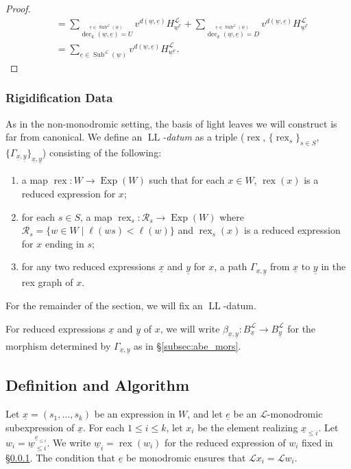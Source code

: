 \documentclass{amsart}
\newcommand{\scrL}{\mathcal{L}}
\DeclareMathOperator{\rex}{rex}
\DeclareMathOperator{\LL}{LL}
\DeclareMathOperator{\dec}{dec}
\DeclareMathOperator{\Exp}{Exp}
\DeclareMathOperator{\Subexp}{Sub}
\newcommand{\ue}{\underline{e}}
\newcommand{\uw}{\underline{w}}
\newcommand{\ux}{\underline{x}}
\newcommand{\uy}{\underline{y}}
\theoremstyle{definition}
\numberwithin{equation}{subsection}
\begin{document}
\begin{proof}
\begin{align*}
        &= \sum_{\stackrel{\ue \in \Subexp^{\scrL} (\uw)}{\dec_k (\uw, \ue) = U}} v^{d(\uw,\ue)} H_{\uw^{\ue}}^{\scrL}  + \sum_{\stackrel{\ue \in \Subexp^{\scrL} (\uw)}{\dec_k (\uw, \ue) = D}} v^{d(\uw,\ue)} H_{\uw^{\ue}}^{\scrL} \\
        &=  \sum_{\ue \in \Subexp^{\scrL} (\uw)} v^{d(\uw,\ue)} H_{\uw^{\ue}}^{\scrL}.
    \end{align*}
\end{proof}


\subsubsection{Rigidification Data}\label{subsec:rigidification_data}

As in the non-monodromic setting, the basis of light leaves we will construct is far from canonical.
We define an \emph{$\LL$-datum} as a triple ($\rex$, $\{\rex_s\}_{s \in S}$, $\{\Gamma_{\ux, \uy}\}_{\ux, \uy}$) consisting of the following:
\begin{enumerate}\label{ll_disiderata}
    \item a map $\rex : W \to \Exp (W)$ such that for each $x \in W$, $\rex (x)$ is a reduced expression for $x$;
    \item for each $s \in S$, a map $\rex_s : \mathscr{R}_s \to \Exp (W)$ where $\mathscr{R}_s = \{ w \in W \mid \ell (ws) < \ell (w) \}$ and $\rex_s (x)$ is a reduced expression for $x$ ending in $s$;
    \item for any two reduced expressions $\ux$ and $\uy$ for $x$, a path $\Gamma_{\ux, \uy}$ from $\ux$ to $\uy$ in the rex graph of $x$.
\end{enumerate}
For the remainder of the section, we will fix an $\LL$-datum. 

For reduced expressions $\ux$ and $\uy$ of $x$, we will write $\beta_{\ux,\uy} : B_{\ux}^{\scrL} \to B_{\uy}^{\scrL}$ for the morphism determined by $\Gamma_{\ux, \uy}$ as in \S\ref{subsec:abe_mors}.

\subsection{Definition and Algorithm}

Let $\ux = (s_1, \ldots, s_k)$ be an expression in $W$, and let $\ue$ be an $\scrL$-monodromic subexpression of $\ux$. For each $1 \leq i \leq k$, let $x_i$ be the element realizing $\ux_{\leq i}$.
Let $w_i = \uw_{\leq i}^{\ue_{\leq i}}$.
We write $\uw_i = \rex (w_i)$ for the reduced expression of $w_i$ fixed in \S \ref{subsec:rigidification_data}. 
The condition that $\ue$ be monodromic ensures that $\scrL x_i = \scrL w_i$.
\end{document}
